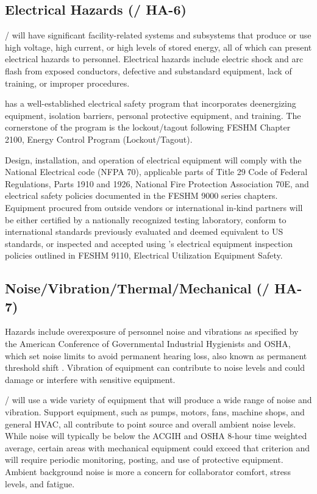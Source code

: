 \subsection{Electrical Hazards (/ HA-6)}

/ will have significant facility-related systems and
subsystems that produce or use high voltage, high current, or high
levels of stored energy, all of which can present electrical hazards
to personnel. Electrical hazards include electric shock and arc flash
from exposed conductors, defective and substandard equipment, lack of
training, or improper procedures.

\fnal has a well-established electrical safety program that
incorporates deenergizing equipment, isolation barriers, personal
protective equipment, and training. The cornerstone of the program is
the lockout/tagout following FESHM 
Chapter 2100, \fnal Energy Control Program (Lockout/Tagout).

Design, installation, and operation of electrical equipment will comply with the National Electrical code (NFPA 70), applicable
parts of Title 29 Code of Federal Regulations, Parts 1910 and 1926,
National Fire Protection Association 70E, and \fnal electrical safety policies documented in the
FESHM 9000 series chapters. Equipment procured from outside vendors or
international in-kind partners will be either certified by a
nationally recognized testing laboratory, conform to
international standards previously evaluated and deemed equivalent to
US standards, or inspected and accepted using \fnal's
electrical equipment inspection policies outlined in FESHM 9110,
Electrical Utilization Equipment Safety.


\subsection{Noise/Vibration/Thermal/Mechanical (/ HA-7)}

Hazards include overexposure of personnel noise and vibrations as specified by the
American Conference of Governmental Industrial Hygienists and
OSHA, which set noise limits to avoid permanent hearing loss, also known as permanent
threshold shift . Vibration of equipment can contribute to
noise levels and could damage or interfere with
sensitive equipment.

/ will use a wide variety of equipment that will
produce a wide range of noise and vibration. Support equipment, such
as pumps, motors, fans, machine shops, and general HVAC, all contribute
to point source and overall ambient noise levels. While noise will
typically be below the ACGIH and OSHA 8-hour time weighted average,
certain areas with mechanical equipment could exceed that criterion
and will require periodic monitoring, posting, and use of
protective equipment. Ambient background noise is more a concern for collaborator comfort, stress levels, and fatigue.

